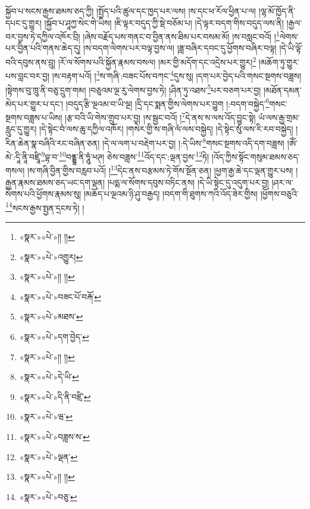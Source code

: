 སྐྱོབ་པ་སངས་རྒྱས་ཐམས་ཅད་ཀྱི། །སྤྱོད་པའི་ཚུལ་དང་ཁྱད་པར་ལས། །ས་དང་ཕ་རོལ་ཕྱིན་པ་ལ། །ལྷ་མོ་ཁྱོད་ནི་དཔང་དུ་གྱུར། །སྐྱོབ་པ་ཤཱཀྱ་སེང་གེ་ཡིས། །ཇི་ལྟར་བདུད་ཀྱི་སྡེ་བཅོམ་པ། །དེ་ལྟར་བདག་གིས་བདུད་ལས་ནི། །རྒྱལ་བར་བྱས་ཏེ་དཀྱིལ་འཁོར་བྲི། །ཞེས་བརྗོད་པས་གནང་བ་བྱིན་ནས་ཐིམ་པར་བསམ་མོ། །ས་བསླང་བའོ། །\footnote{«སྣར་»«པེ་»།། །།}ལེགས་པར་བྱིན་པའི་གནས་ཆེད་དུ། །ས་བདག་ལེགས་པར་བལྟ་བྱས་ལ། །ཟླ་བཞིར་དབང་དུ་ཕྱོགས་བཞིར་བལྟ། །དེ་ཡི་ལྟོ་བའི་དབུས་ནས་བྲུ། །རོ་ལ་སོགས་པའི་སྐྱོན་རྣམས་བསལ། །མར་གྱི་མདོག་དང་འདྲེས་པར་གྱུར།\footnote{«སྣར་»«པེ་»འགྱུར།} །མཆོག་ཏུ་གྱུར་པས་བླང་བར་བྱ། །ས་བརྟག་པའོ། །\footnote{«སྣར་»«པེ་»།། །།}ས་གཞི་:བཟང་པོས་བཀང་\footnote{«སྣར་»«པེ་»བཟང་པོ་བརྐོ་}དུས་སུ། །དག་པར་བྱེད་པའི་གསང་སྔགས་བཟླས། །སྟེགས་བུ་ཁྲུ་ནི་བཅུ་དྲུག་གམ། །བཅུའམ་ལྔ་རུ་ལེགས་བྱས་ཏེ། །ཤིན་ཏུ་འཐས་\footnote{«སྣར་»«པེ་»མཐས་}པར་བཅག་པར་བྱ། །མཐོན་དམན་མེད་པར་གྱུར་པ་དང་། །བདུད་རྩི་ལྔའམ་བ་ཡི་ལྔ། །དྲི་དང་སྨན་གྱིས་ལེགས་པར་བྱུག །:བདག་བསྐྱེད་\footnote{«སྣར་»«པེ་»དག་བྱེད་}གསང་སྔགས་བཟླས་པ་ཡིས། །རྩ་བའི་ཡི་གེས་གྲུབ་པར་བྱ། །ས་སྦྱང་བའོ། །\footnote{«སྣར་»«པེ་»།། །།}དེ་ནས་ས་ལས་འོད་བྱུང་སྟེ། ཡཾ་ལས་རྒྱ་གྲམ་རླུང་དུ་གྱུར། །དེ་སྟེང་བཾ་ལས་ཆུ་དཀྱིལ་འཁོར། །གསེར་གྱི་ས་གཞི་ལཾ་ལས་བསྐྱེད། །དེ་སྟེང་སུཾ་ལས་རི་རབ་བསྐྱེད། །རིན་ཆེན་སྣ་བཞིའི་རང་བཞིན་ཅན། །དེ་ལ་ལག་པ་བརྡེག་པར་བྱ། །:དེ་ཡིས་\footnote{«སྣར་»«པེ་»དེ་ཡི་}གསང་སྔགས་འདི་དག་བཟླས། །ཨོཾ་མེ་:དཱི་ནཱི་བཛྲཱི་\footnote{«སྣར་»«པེ་»དི་ནི་བཛྲི་}བྷ་བ་\footnote{«སྣར་»«པེ་»ཝ་}བནྡྷ་ནི་ཧཱུཾ་ཕཊ། ཅེས་བཟླས་\footnote{«སྣར་»«པེ་»བཟླས་ས་}འོད་དང་:ལྡན་བྱས་\footnote{«སྣར་»«པེ་»ལྡན་}ཏེ། །འོད་ཀྱིས་སྟོང་གསུམ་ཐམས་ཅད་གསལ། །ས་གཞི་བྱིན་གྱིས་བརླབ་པའོ། །\footnote{«སྣར་»«པེ་»།། །།}དེང་ནས་བརྩམས་ཏེ་གོས་སྔོན་ཅན། །ཕྱག་རྒྱ་ཆེ་དང་ལྡན་གྱུར་པས། །རྒྱན་རྣམས་ཐམས་ཅད་ཡང་དག་ལྡན། །པདྨ་ལ་སོགས་དབུས་བཏིང་ནས། །དེ་ཡི་སྟེང་དུ་འདུག་པར་བྱ། །ཤར་ལ་སོགས་པའི་ཕྱོགས་རྣམས་སུ། །མཆོད་པ་ལྔའམ་ཉི་ཤུ་བརྒྱད། །བདག་གི་ཐུགས་ཀའི་འོད་ཟེར་གྱིས། །ཕྱོགས་བཅུའི་\footnote{«སྣར་»«པེ་»བཅུ་}སངས་རྒྱས་སྤྱན་དྲངས་ཏེ། །
